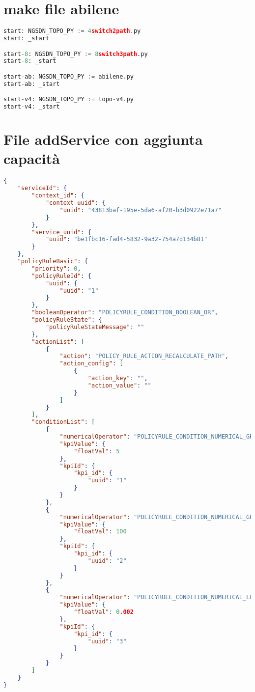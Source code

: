 \section{make file abilene}
\begin{lstlisting}[language=Python]
start: NGSDN_TOPO_PY := 4switch2path.py
start: _start

start-8: NGSDN_TOPO_PY := 8switch3path.py
start-8: _start

start-ab: NGSDN_TOPO_PY := abilene.py
start-ab: _start

start-v4: NGSDN_TOPO_PY := topo-v4.py
start-v4: _start
\end{lstlisting}

\section{File addService con aggiunta capacità}
\label{cap:polcap}
\begin{lstlisting}[language=json]
{
    "serviceId": {
        "context_id": {
            "context_uuid": {
                "uuid": "43813baf-195e-5da6-af20-b3d0922e71a7"
            }
        },
        "service_uuid": {
            "uuid": "be1fbc16-fad4-5832-9a32-754a7d134b81"
        }
    },
    "policyRuleBasic": {
        "priority": 0,
        "policyRuleId": {
            "uuid": {
                "uuid": "1"
            }
        },
        "booleanOperator": "POLICYRULE_CONDITION_BOOLEAN_OR",
        "policyRuleState": {
            "policyRuleStateMessage": ""
        },
        "actionList": [
            {
                "action": "POLICY_RULE_ACTION_RECALCULATE_PATH",
                "action_config": [
                    {
                        "action_key": "",
                        "action_value": ""
                    }
                ]
            }
        ],
        "conditionList": [
            {
                "numericalOperator": "POLICYRULE_CONDITION_NUMERICAL_GREATER_THAN",
                "kpiValue": {
                    "floatVal": 5
                },
                "kpiId": {
                    "kpi_id": {
                        "uuid": "1"
                    }
                }
            },
            {
                "numericalOperator": "POLICYRULE_CONDITION_NUMERICAL_GREATER_THAN",
                "kpiValue": {
                    "floatVal": 100
                },
                "kpiId": {
                    "kpi_id": {
                        "uuid": "2"
                    }
                }
            },
            {
                "numericalOperator": "POLICYRULE_CONDITION_NUMERICAL_LESS_THAN",
                "kpiValue": {
                    "floatVal": 0.002
                },
                "kpiId": {
                    "kpi_id": {
                        "uuid": "3"
                    }
                }
            }
        ]
    }
}
\end{lstlisting}

